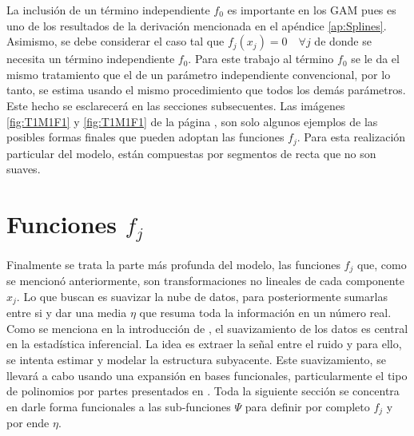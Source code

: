 \documentclass[../Main/Main.tex]{subfiles}
\begin{document}
La inclusión de un término independiente $f_0$ es importante en los GAM pues es uno de los resultados de la derivación mencionada en el apéndice \ref{ap:Splines}. Asimismo, se debe considerar el caso tal que $f_j(x_j)=0\quad\forall j$ de donde se necesita un término independiente $f_0$. Para este trabajo al término $f_0$ se le da el mismo tratamiento que el de un parámetro independiente convencional, por lo tanto, se estima usando el mismo procedimiento que todos los demás parámetros. Este hecho se esclarecerá en las secciones subsecuentes. Las imágenes \ref{fig:T1M1F1} y  \ref{fig:T1M1F1} de la página \pageref{fig:T1M1F1}, son solo algunos ejemplos de las posibles formas finales que pueden adoptan las funciones $f_j$. Para esta realización particular del modelo, están compuestas por segmentos de recta que no son suaves.

\section{Funciones $f_j$} \label{sec:fj}
Finalmente se trata la parte más profunda del modelo, las funciones $f_j$  que, como se mencionó anteriormente, son transformaciones no lineales de cada componente $x_j$. Lo que buscan es suavizar la nube de datos, para posteriormente sumarlas entre si y dar una media $\eta$ que resuma toda la información en un número real. Como se menciona en la introducción de \citet{hardle2004semiparametric}, el suavizamiento de los datos es central en la estadística inferencial. La idea es extraer la señal entre el ruido y para ello, se intenta estimar y modelar la estructura subyacente. Este suavizamiento, se llevará a cabo usando una expansión en bases funcionales, particularmente el tipo de polinomios por partes presentados en \citet{mallik1998automatic}. Toda la siguiente sección se concentra en darle forma funcionales a las sub-funciones $\Psi$ para definir por completo $f_j$ y por ende $\eta$. 
\end{document}
